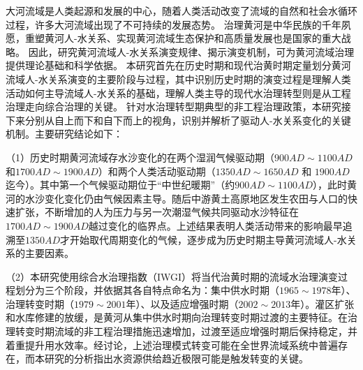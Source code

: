 \begin{cabstract}



大河流域是人类起源和发展的中心，随着人类活动改变了流域的自然和社会水循环过程，许多大河流域出现了不可持续的发展态势。
治理黄河是中华民族的千年夙愿，重塑黄河人-水关系、实现黄河流域生态保护和高质量发展也是国家的重大战略。
因此，研究黄河流域人-水关系演变规律、揭示演变机制，可为黄河流域治理提供理论基础和科学依据。
本研究首先在历史时期和现代治黄时期定量划分黄河流域人-水关系演变的主要阶段与过程，其中识别历史时期的演变过程是理解人类活动如何主导流域人-水关系的基础，理解人类主导的现代水治理转型则是从工程治理走向综合治理的关键。
针对水治理转型期典型的非工程治理政策，本研究接下来分别从自上而下和自下而上的视角，识别并解析了驱动人-水关系变化的关键机制。主要研究结论如下：

（1）历史时期黄河流域存水沙变化的在两个湿润气候驱动期（$900AD\sim1100AD$和$1700AD\sim1900AD$）和两个人类活动驱动期（$1350AD \sim 1650AD$ 和 $1900AD$迄今）。其中第一个气候驱动期位于“中世纪暖期”（约$900AD \sim 1100AD$），此时黄河的水沙变化变化仍由气候因素主导。随后中游黄土高原地区发生农田与人口的快速扩张，不断增加的人为压力与另一次潮湿气候共同驱动水沙特征在$1700AD \sim 1900AD$越过变化的临界点。上述结果表明人类活动带来的影响最早追溯至$1350AD$才开始取代周期变化的气候，逐步成为历史时期主导黄河流域人-水关系的主要因素。

（2）本研究使用综合水治理指数（IWGI）将当代治黄时期的流域水治理演变过程划分为三个阶段，并依据其各自特点命名为：集中供水时期（$1965 \sim 1978$年）、治理转变时期（$1979 \sim 2001$年）、以及适应增强时期（$2002 \sim 2013$年）。灌区扩张和水库修建的放缓，是黄河从集中供水时期向治理转变时期过渡的主要特征。在治理转变时期流域的非工程治理措施迅速增加，过渡至适应增强时期后保持稳定，并着重提升用水效率。经讨论，上述治理模式转变可能在全世界流域系统中普遍存在，而本研究的分析指出水资源供给趋近极限可能是触发转变的关键。


\end{cabstract}
